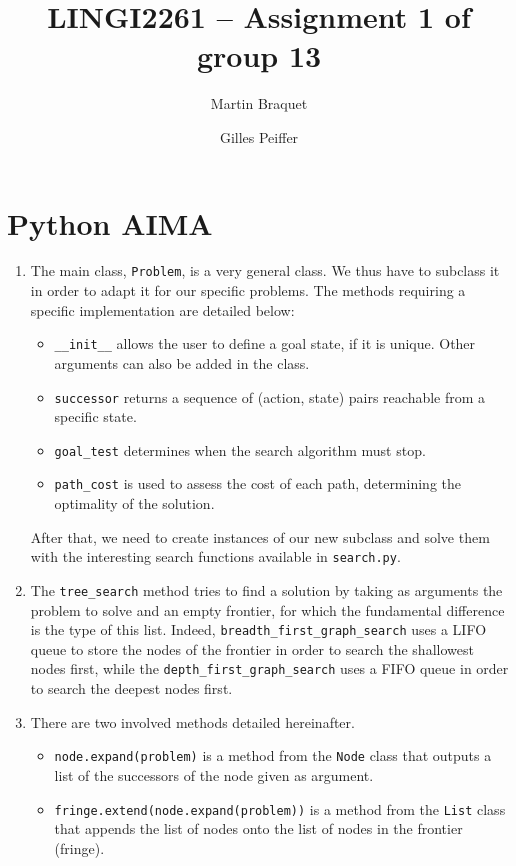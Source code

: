 \documentclass[a4paper,10pt]{article}
\title{LINGI2261 -- Assignment 1 of group 13}
\author{Martin Braquet \and Gilles Peiffer}
\newcommand{\py}[1]{\texttt{#1}}
\begin{document}
\maketitle

\section{Python AIMA}

\begin{enumerate}
 \item The main class, \py{Problem}, is a very general class. We thus have to subclass it in order to adapt it for our specific problems. The methods requiring a specific implementation are detailed below:
 
 \begin{itemize}
  \item \py{__init__} allows the user to define a goal state, if it is unique.
  Other arguments can also be added in the class.
  \item \py{successor} returns a sequence of (action, state) pairs reachable from a specific state.
  \item \py{goal_test} determines when the search algorithm must stop.
  \item \py{path_cost} is used to assess the cost of each path, determining the optimality of the solution.
 \end{itemize}
 After that, we need to create instances of our new subclass and solve them with the interesting search functions available in \texttt{search.py}.
 \item The \py{tree_search} method tries to find a solution by taking as arguments the problem to solve and an empty frontier, for which the fundamental difference is the type of this list.
 Indeed, \py{breadth_first_graph_search} uses a LIFO queue to store the nodes of the frontier in order to search the shallowest nodes first, while the \py{depth_first_graph_search} uses a FIFO queue in order to search the deepest nodes first.
 \item There are two involved methods detailed hereinafter.
 \begin{itemize}
 	\item \py{node.expand(problem)} is a method from the \py{Node} class that outputs a list of the successors of the node given as argument.
 	\item \py{fringe.extend(node.expand(problem))} is a method from the \py{List} class that appends the list of nodes onto the list of nodes in the frontier (fringe).

\end{itemize}
\end{enumerate}
\end{document}
